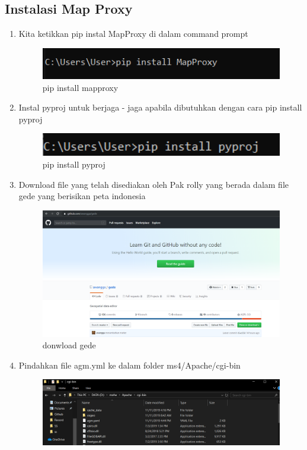 \subsection{Instalasi Map Proxy}
\begin{enumerate}
    \item Kita ketikkan pip instal MapProxy di dalam command prompt
    \hfill\break
    \begin{figure}[H]
		\includegraphics[width=12cm]{figures/1174040/Python3/5.PNG}
		\centering
		\caption{pip install mapproxy}
	\end{figure}
    \item Instal pyproj untuk berjaga - jaga apabila dibutuhkan dengan cara pip install pyproj
    \hfill\break
    \begin{figure}[H]
		\includegraphics[width=12cm]{figures/1174040/Python3/6.PNG}
		\centering
		\caption{pip install pyproj}
	\end{figure}
    \item Download file yang telah disediakan oleh Pak rolly yang berada dalam file gede yang berisikan peta indonesia
    \hfill\break
    \begin{figure}[H]
		\includegraphics[width=12cm]{figures/1174040/Python3/7.PNG}
		\centering
		\caption{donwload gede}
	\end{figure}
    \item Pindahkan file agm.yml ke dalam folder ms4/Apache/cgi-bin
    \hfill\break
    \begin{figure}[H]
		\includegraphics[width=12cm]{figures/1174040/Python3/8.PNG}

\end{figure}
\end{enumerate}
